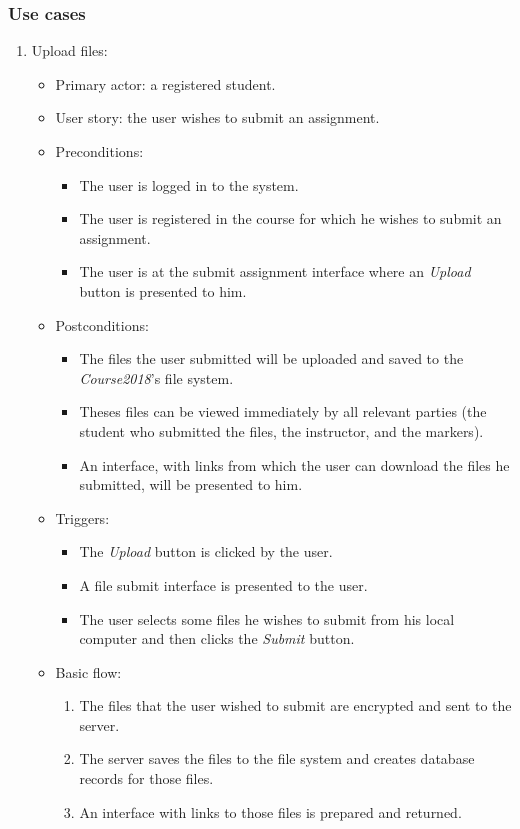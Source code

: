\subsubsection{Use cases}
\begin{enumerate}

\item Upload files:
\begin{itemize}
    \item Primary actor: a registered student.
    \item User story: the user wishes to submit an assignment.
    \item Preconditions:
        \begin{itemize}
            \item The user is logged in to the system.
            \item The user is registered in the course for which he wishes to
                submit an assignment.
            \item The user is at the submit assignment interface where an
                \emph{Upload} button is presented to him.
        \end{itemize}
    \item Postconditions:
        \begin{itemize}
            \item The files the user submitted will be uploaded and saved to the
                \emph{Course2018}'s file system.
            \item Theses files can be viewed immediately by all relevant parties
                (the student who submitted the files, the instructor,
                and the markers).
            \item An interface, with links from which the user can
                download the files he submitted, will be presented
                to him.
        \end{itemize}
    \item Triggers:
        \begin{itemize}
            \item The \emph{Upload} button is clicked by the user.
            \item A file submit interface is presented to the user.
            \item The user selects some files he wishes to submit from his
                local computer and then clicks the \emph{Submit} button.
        \end{itemize}
    \item Basic flow:
        \begin{enumerate}
            \item The files that the user wished to submit are encrypted and
                sent to the server.
            \item The server saves the files to the file system and creates
                database records for those files.
            \item An interface with links to those files is prepared and
                returned.
        \end{enumerate}
\end{itemize}


\end{enumerate}
